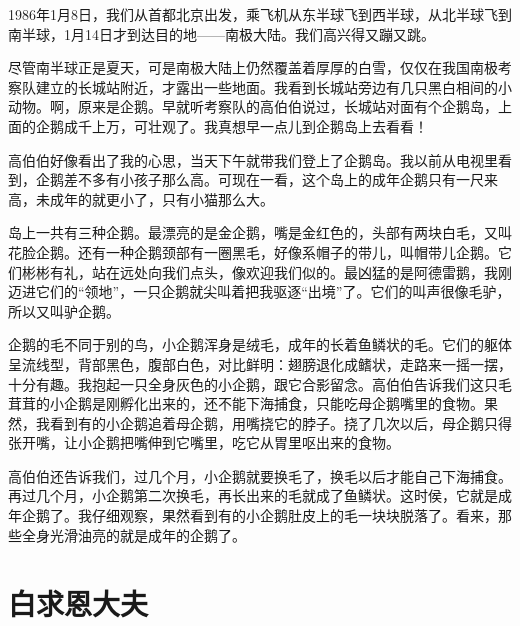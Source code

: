 \documentclass[12pt,UTF-8,openany]{ctexbook}
\begin{document}
\begin{Large}
    
    1986年1月8日，我们从首都北京出发，乘飞机从东半球飞到西半球，从北半球飞到南半球，1月14日才到达目的地——南极大陆。我们高兴得又蹦又跳。
    
    尽管南半球正是夏天，可是南极大陆上仍然覆盖着厚厚的白雪，仅仅在我国南极考察队建立的长城站附近，才露出一些地面。我看到长城站旁边有几只黑白相间的小动物。啊，原来是企鹅。早就听考察队的高伯伯说过，长城站对面有个企鹅岛，上面的企鹅成千上万，可壮观了。我真想早一点儿到企鹅岛上去看看！
    
    高伯伯好像看出了我的心思，当天下午就带我们登上了企鹅岛。我以前从电视里看到，企鹅差不多有小孩子那么高。可现在一看，这个岛上的成年企鹅只有一尺来高，未成年的就更小了，只有小猫那么大。
    
    岛上一共有三种企鹅。最漂亮的是金企鹅，嘴是金红色的，头部有两块白毛，又叫花脸企鹅。还有一种企鹅颈部有一圈黑毛，好像系帽子的带儿，叫帽带儿企鹅。它们彬彬有礼，站在远处向我们点头，像欢迎我们似的。最凶猛的是阿德雷鹅，我刚迈进它们的“领地”，一只企鹅就尖叫着把我驱逐“出境”了。它们的叫声很像毛驴，所以又叫驴企鹅。
    
    企鹅的毛不同于别的鸟，小企鹅浑身是绒毛，成年的长着鱼鳞状的毛。它们的躯体呈流线型，背部黑色，腹部白色，对比鲜明：翅膀退化成鳍状，走路来一摇一摆，十分有趣。我抱起一只全身灰色的小企鹅，跟它合影留念。高伯伯告诉我们这只毛茸茸的小企鹅是刚孵化出来的，还不能下海捕食，只能吃母企鹅嘴里的食物。果然，我看到有的小企鹅追着母企鹅，用嘴挠它的脖子。挠了几次以后，母企鹅只得张开嘴，让小企鹅把嘴伸到它嘴里，吃它从胃里呕出来的食物。
    
    高伯伯还告诉我们，过几个月，小企鹅就要换毛了，换毛以后才能自己下海捕食。再过几个月，小企鹅第二次换毛，再长出来的毛就成了鱼鳞状。这时侯，它就是成年企鹅了。我仔细观察，果然看到有的小企鹅肚皮上的毛一块块脱落了。看来，那些全身光滑油亮的就是成年的企鹅了。
    
\end{Large}

\chapter{白求恩大夫}
\end{document}
